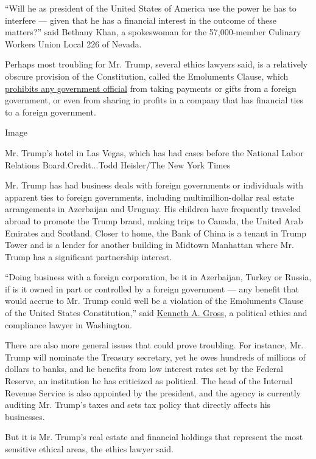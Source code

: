 ``Will he as president of the United States of America use the power he
has to interfere --- given that he has a financial interest in the
outcome of these matters?'' said Bethany Khan, a spokeswoman for the
57,000-member Culinary Workers Union Local 226 of Nevada.

Perhaps most troubling for Mr. Trump, several ethics lawyers said, is a
relatively obscure provision of the Constitution, called the Emoluments
Clause, which
\href{https://www.justice.gov/sites/default/files/olc/opinions/1982/02/31/op-olc-v006-p0156.pdf}{prohibits
any government official} from taking payments or gifts from a foreign
government, or even from sharing in profits in a company that has
financial ties to a foreign government.

Image

Mr. Trump's hotel in Las Vegas, which has had cases before the National
Labor Relations Board.Credit...Todd Heisler/The New York Times

Mr. Trump has had business deals with foreign governments or individuals
with apparent ties to foreign governments, including multimillion-dollar
real estate arrangements in Azerbaijan and Uruguay. His children have
frequently traveled abroad to promote the Trump brand, making trips to
Canada, the United Arab Emirates and Scotland. Closer to home, the Bank
of China is a tenant in Trump Tower and is a lender for another building
in Midtown Manhattan where Mr. Trump has a significant partnership
interest.

``Doing business with a foreign corporation, be it in Azerbaijan, Turkey
or Russia, if is it owned in part or controlled by a foreign government
--- any benefit that would accrue to Mr. Trump could well be a violation
of the Emoluments Clause of the United States Constitution,'' said
\href{https://www.skadden.com/professionals/kenneth-gross}{Kenneth A.
Gross,} a political ethics and compliance lawyer in Washington.

There are also more general issues that could prove troubling. For
instance, Mr. Trump will nominate the Treasury secretary, yet he owes
hundreds of millions of dollars to banks, and he benefits from low
interest rates set by the Federal Reserve, an institution he has
criticized as political. The head of the Internal Revenue Service is
also appointed by the president, and the agency is currently auditing
Mr. Trump's taxes and sets tax policy that directly affects his
businesses.

But it is Mr. Trump's real estate and financial holdings that represent
the most sensitive ethical areas, the ethics lawyer said.

